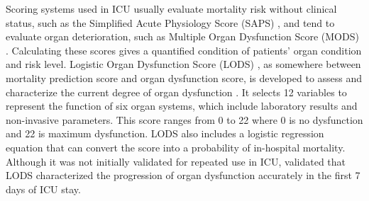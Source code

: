 \documentclass[12pt,a4paper,english
]{tunithesis}
\begin{document}
Scoring systems used in ICU usually evaluate mortality risk without clinical status, such as the Simplified Acute Physiology Score (SAPS) \parencite{Gall1984}, and tend to evaluate organ deterioration, such as Multiple Organ Dysfunction Score (MODS) \parencite{Marshall1995}. Calculating these scores gives a quantified condition of patients' organ condition and risk level. Logistic Organ Dysfunction Score (LODS) \parencite{legall96}, as somewhere between mortality prediction score and organ dysfunction score, is developed to assess and characterize the current degree of organ dysfunction \parencite{Tiffany21, Vincent2010}. It selects 12 variables to represent the function of six organ systems, which include laboratory results and non-invasive parameters. This score ranges from 0 to 22 where 0 is no dysfunction and 22 is maximum dysfunction. LODS also includes a logistic regression equation that can convert the score into a probability of in-hospital mortality. Although it was not initially validated for repeated use in ICU, \textcite{Timsit2002} validated that LODS characterized the progression of organ dysfunction accurately in the first 7 days of ICU stay.
\end{document}
